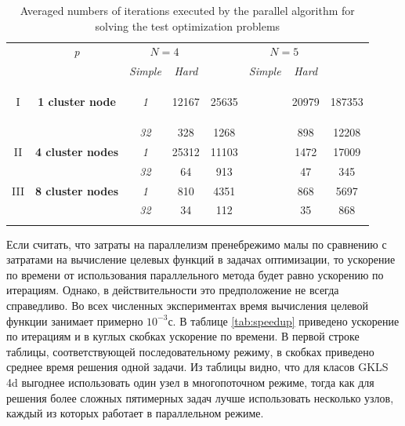 \documentclass[runningheads]{llncs}
\begin{document}
\begin{table}
  \centering
  \caption{Averaged numbers of iterations executed by the parallel algorithm for solving the test optimization problems}
  \label{tab:iterations}
  \begin{tabular}{cccccccc}
    \cline{3-8}\noalign{\smallskip}
    \multicolumn{2}{c}{  } & \textit{p} & \multicolumn{2}{c}{$N=4$} & & \multicolumn{2}{c}{$N=5$}   \\
    \noalign{\smallskip} \cline{4-5} \cline{7-8}  \noalign{\smallskip}
    \multicolumn{2}{c}{  } & & \textit{Simple} & \textit{Hard} & & \textit{Simple} & \textit{Hard}  \\
    \noalign{\smallskip}\hline
    I &
    \parbox{0.25\textwidth}{
    \begin{center}
    \textbf{1 cluster node}
    \end{center}		}
      & \textit{1} & 12167 & 25635 & & 20979 & 187353  \\
    &  & \textit{32} & 328 & 1268  & &   898 & 12208 \\
    \hline \noalign{\smallskip}
II  & \textbf{4 cluster nodes}  %
  & \textit{1} & 25312 & 11103 & & 1472 & 17009 \\
&   & \textit{32} & 64 &   913 & & 47 & 345 \\
    \noalign{\smallskip}\hline	\noalign{\smallskip}
III & \textbf{8 cluster nodes} %
  & \textit{1}  & 810 & 4351 & & 868 & 5697  \\
& & \textit{32} & 34  & 112  & & 35  & 868 \\
    \noalign{\smallskip}\hline
  \end{tabular}
\end{table}

Если считать, что затраты на параллелизм пренебрежимо малы по сравнению с затратами на вычисление целевых функций в задачах оптимизации, то ускорение по времени от использования параллельного метода будет равно ускорению по итерациям. Однако, в действительности это предположение не всегда справедливо. Во всех численных экспериментах время вычисления целевой функции занимает примерно $10^{-3}$с. В таблице \ref{tab:speedup} приведено ускорение по итерациям и в куглых скобках ускорение по времени. В первой строке таблицы, соответствующей последовательному режиму, в скобках приведено среднее время решения одной задачи. Из таблицы видно, что для класов GKLS 4d выгоднее использовать один узел в многопоточном режиме, тогда как для решения более сложных пятимерных задач лучше использовать несколько узлов, каждый из которых работает в параллельном режиме.
\end{document}
